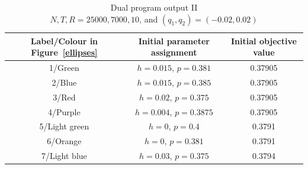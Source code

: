 \documentclass[12pt]{article}
\numberwithin{equation}{section}
\begin{document}




\begin{table}[h!] \centering
\begin{footnotesize}

 \begin{tabular}{|c| c | c| } 
 \hline
       Label/Colour in Figure~\ref{ellipses} &  Initial parameter assignment & Initial objective value  \\
 \hline
 1/Green & $h = 0.015$, $p = 0.381$ & 0.37905 \\
 \hline
  2/Blue &   $h= 0.015$, $p = 0.385$ & 0.37905 \\
 \hline
  3/Red & $h= 0.02$, $p = 0.375$ & 0.37905 \\
 \hline
  4/Purple &  $h = 0.004$, $p = 0.3875$ & 0.37905 \\ 
 \hline
  5/Light green & $h = 0$, $p = 0.4$ & 0.3791 \\
 \hline
  6/Orange & $h = 0$, $p = 0.381$  & 0.3791\\
 \hline
  7/Light blue & $h = 0.03$, $p = 0.375$  & 0.3794 \\
 \hline


\end{tabular}
\end{footnotesize}

\caption{Dual program output II \\ $N,T ,R= 25000,7000,10$, and $(q_1,q_2) = (-0.02,0.02)$}
\label{dprogout2}
\end{table}
\end{document}
